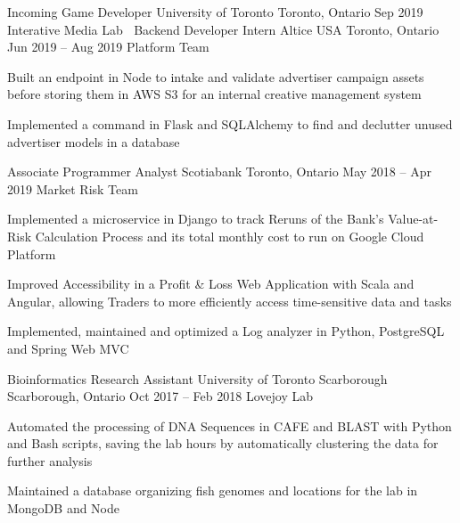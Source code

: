 \begin{cventries}
  \cventry
    {Incoming Game Developer}
    {University of Toronto}
    {Toronto, Ontario}
    {Sep 2019}
    {Interative Media Lab}
    {
      $\:$
    }
  \cventry
    {Backend Developer Intern}
    {Altice USA}
    {Toronto, Ontario}
    {Jun 2019 -- Aug 2019}
    {Platform Team}
    {
    \begin{cvitems}
      \item {Built an endpoint in Node to intake and validate advertiser campaign assets before storing them in AWS S3 for an internal creative management system}
      \item {Implemented a command in Flask and SQLAlchemy to find and declutter unused advertiser models in a database}
    \end{cvitems}
    }
  \cventry
    {Associate Programmer Analyst}
    {Scotiabank}
    {Toronto, Ontario}
    {May 2018 -- Apr 2019}
    {Market Risk Team}
    {
      \begin{cvitems}
        \item {Implemented a microservice in Django to track Reruns of the Bank's Value-at-Risk Calculation Process and its total monthly cost to run on Google Cloud Platform}
        \item {Improved Accessibility in a Profit \& Loss Web Application with Scala and Angular, allowing Traders to more efficiently access time-sensitive data and tasks}
        \item {Implemented, maintained and optimized a Log analyzer in Python, PostgreSQL and Spring Web MVC}
      \end{cvitems}
    }

  \cventry
    {Bioinformatics Research Assistant}
    {University of Toronto Scarborough}
    {Scarborough, Ontario}
    {Oct 2017 -- Feb 2018}
    {Lovejoy Lab}
    {
      \begin{cvitems}
        \item {Automated the processing of DNA Sequences in CAFE and BLAST with Python and Bash scripts, saving the lab hours by automatically clustering the data for further analysis}
        \item {Maintained a database organizing fish genomes and locations for the lab in MongoDB and Node}
      \end{cvitems}
    }
\end{cventries}
